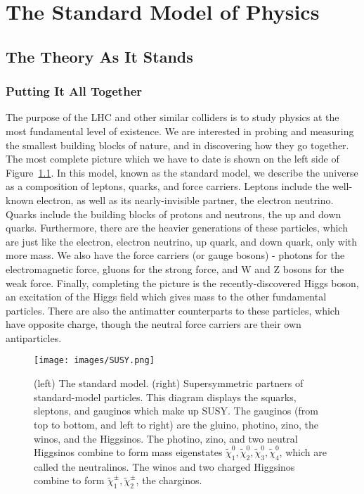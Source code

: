 \chapter{The Standard Model of Physics}\label{chap:SM}

\section{The Theory As It Stands}

\subsection{Putting It All Together}

The purpose of the LHC and other similar colliders is to study physics at the most fundamental level of existence. We are interested in probing and measuring the smallest building blocks of nature, and in discovering how they go together. The most complete picture which we have to date is shown on the left side of Figure~\ref{SUSY}. In this model, known as the standard model, we describe the universe as a composition of leptons, quarks, and force carriers. Leptons include the well-known electron, as well as its nearly-invisible partner, the electron neutrino. Quarks include the building blocks of protons and neutrons, the up and down quarks. Furthermore, there are the heavier generations of these particles, which are just like the electron, electron neutrino, up quark, and down quark, only with more mass. We also have the force carriers (or gauge bosons) - photons for the electromagnetic force, gluons for the strong force, and W and Z bosons for the weak force. Finally, completing the picture is the recently-discovered Higgs boson, an excitation of the Higgs field which gives mass to the other fundamental particles. There are also the antimatter counterparts to these particles, which have opposite charge, though the neutral force carriers are their own antiparticles.


\begin{figure}[t]
    \centering
    \texttt{[image: images/SUSY.png]}
    \caption{(left) The standard model. (right) Supersymmetric partners of standard-model particles. This diagram displays the squarks, sleptons, and gauginos which make up SUSY. The gauginos (from top to bottom, and left to right) are the gluino, photino, zino, the winos, and the Higgsinos. The photino, zino, and two neutral Higgsinos combine to form mass eigenstates $\tilde{\chi}^0_1, \tilde{\chi}^0_2, \tilde{\chi}^0_3, \tilde{\chi}^0_4$, which are called the neutralinos. The winos and two charged Higgsinos combine to form $\tilde{\chi}^\pm_1, \tilde{\chi}^\pm_2$, the charginos.}
    \label{SUSY}
\end{figure}

